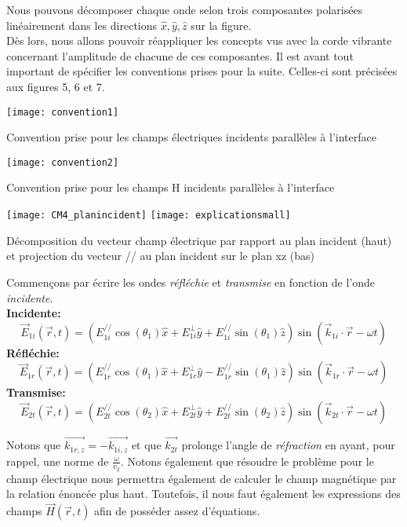 Nous pouvons décomposer chaque onde selon trois composantes polarisées linéairement dans les directions $\hat{x}, \hat{y}, \hat{z}$ sur la figure. \\
Dès lors, nous allons pouvoir réappliquer les concepts vus avec la corde vibrante concernant l'amplitude de chacune de ces composantes. Il est avant tout important de spécifier les conventions prises pour la suite. Celles-ci sont précisées aux figures 5, 6 et 7.
\begin{marginfigure}[-4cm]
\texttt{[image: convention1]}
\caption{Convention prise pour les champs électriques incidents parallèles à l'interface}
\end{marginfigure}
\begin{marginfigure}
	\texttt{[image: convention2]}
	\caption{Convention prise pour les champs H incidents parallèles à l'interface}
\end{marginfigure}
\begin{marginfigure}
	\texttt{[image: CM4\_planincident]}
	\texttt{[image: explicationsmall]}
	\caption{Décomposition du vecteur champ électrique par rapport au plan incident (haut) et projection du vecteur // au plan incident sur le plan xz (bas)}
	\label{decomp}
\end{marginfigure}
 Commençons par écrire les ondes \textit{réfléchie} et \textit{transmise} en fonction de l'onde \textit{incidente}.\\
\textbf{Incidente:} $$ \vec{E}_{1i} (\vec{r},t) = (E^{//}_{1i} \cos(\theta_{1})  \hat{x} + E_{1i}^{\perp} \hat{y} + E_{1i}^{//} \sin(\theta_{1}) \hat{z} ) \sin(\vec{k}_{1i}\cdot \vec{r} - \omega t) $$  
\textbf{Réfléchie:}  $$ \vec{E}_{1r} (\vec{r},t) = (E^{//}_{1r} \cos(\theta_{1})  \hat{x} + E_{1r}^{\perp} \hat{y} - E_{1r}^{//} \sin(\theta_{1}) \hat{z} ) \sin(\vec{k}_{1r}\cdot \vec{r} - \omega t) $$
\textbf{Transmise:}$$ \vec{E}_{2t} (\vec{r},t) = (E^{//}_{2t} \cos(\theta_{2})  \hat{x} + E_{2t}^{\perp} \hat{y} + E_{2t}^{//} \sin(\theta_{2}) \hat{z} ) \sin(\vec{k}_{2t}\cdot \vec{r} - \omega t) $$ 

 
Notons que $\vec{k_{1r,z}} = - \vec{k_{1i,z}}$ et que $\vec{k_{2t}}$ prolonge l'angle de \textit{réfraction} en ayant, pour rappel, une norme de $\frac{\omega}{v_{2}}$.
Notons également que résoudre le problème pour le champ électrique nous permettra également de calculer le champ magnétique par la relation énoncée plus haut.
Toutefois, il nous faut également les expressions des champs $\vec{H}(\vec{r},t)$ afin de posséder assez d'équations.

